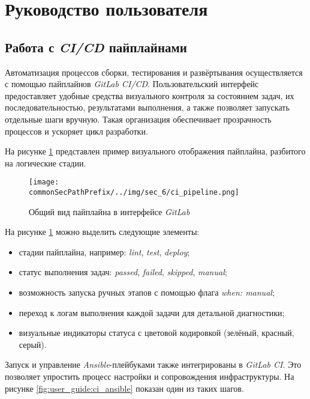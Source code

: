 \section{Руководство пользователя}

\subsection{Работа с \textit{CI/CD} пайплайнами}

Автоматизация процессов сборки, тестирования и развёртывания осуществляется с помощью пайплайнов \textit{GitLab CI/CD}. Пользовательский интерфейс предоставляет удобные средства визуального контроля за состоянием задач, их последовательностью, результатами выполнения, а также позволяет запускать отдельные шаги вручную. Такая организация обеспечивает прозрачность процессов и ускоряет цикл разработки.

На рисунке \ref{fig:user_guide:ci_pipeline} представлен пример визуального отображения пайплайна, разбитого на логические стадии. 

\begin{figure}[ht]
    \centering
    \texttt{[image: \\commonSecPathPrefix/../img/sec\_6/ci\_pipeline.png]}
    \caption{Общий вид пайплайна в интерфейсе \textit{GitLab}}
    \label{fig:user_guide:ci_pipeline}
\end{figure}

На рисунке \ref{fig:user_guide:ci_pipeline} можно выделить следующие элементы:
\begin{itemize}
    \item стадии пайплайна, например: \textit{lint}, \textit{test}, \textit{deploy};
    \item статус выполнения задач: \textit{passed}, \textit{failed}, \textit{skipped}, \textit{manual};
    \item возможность запуска ручных этапов с помощью флага \textit{when: manual};
    \item переход к логам выполнения каждой задачи для детальной диагностики;
    \item визуальные индикаторы статуса с цветовой кодировкой (зелёный, красный, серый).
\end{itemize}

Запуск и управление \textit{Ansible}-плейбуками также интегрированы в \textit{GitLab CI}. Это позволяет упростить процесс настройки и сопровождения инфраструктуры. На рисунке \ref{fig:user_guide:ci_ansible} показан один из таких шагов.

